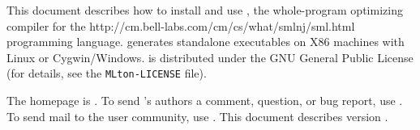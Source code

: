 This document describes how to install and use {\mlton}, the
whole-program optimizing compiler for the
		  {http://cm.bell-labs.com/cm/cs/what/smlnj/sml.html}
programming language.
{\mlton} generates standalone executables on X86 machines with
Linux or Cygwin/Windows. 
{\mlton} is distributed under the GNU General Public License (for details, see
the {\tt MLton-LICENSE} file).

The {\mlton} homepage is \absolutelink{}.
To send {\mlton}'s authors a comment, question, or bug report, use
\mltonmail.
To send mail to the {\mlton} user community, use
.
This document describes {\mlton} version {\version}.

